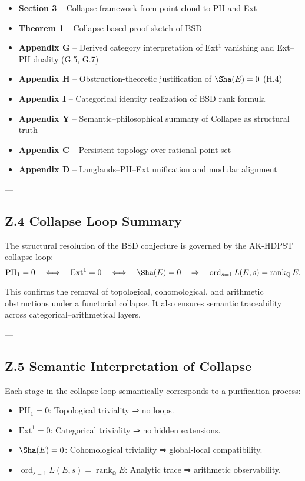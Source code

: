 \documentclass[11pt]{article}
\theoremstyle{definition}
\begin{document}
\begin{itemize}
  \item \textbf{Section 3} – Collapse framework from point cloud to PH and Ext
  \item \textbf{Theorem 1} – Collapse-based proof sketch of BSD
  \item \textbf{Appendix G} – Derived category interpretation of Ext$^1$ vanishing and Ext–PH duality (G.5, G.7)
  \item \textbf{Appendix H} – Obstruction-theoretic justification of \( \Sha(E) = 0 \) (H.4)
  \item \textbf{Appendix I} – Categorical identity realization of BSD rank formula
  \item \textbf{Appendix Y} – Semantic–philosophical summary of Collapse as structural truth
  \item \textbf{Appendix C} – Persistent topology over rational point set
  \item \textbf{Appendix D} – Langlands–PH–Ext unification and modular alignment
\end{itemize}

---

\subsection*{Z.4 Collapse Loop Summary}

The structural resolution of the BSD conjecture is governed by the AK-HDPST collapse loop:
\[
\mathrm{PH}_1 = 0 
\quad \Longleftrightarrow \quad \mathrm{Ext}^1 = 0 
\quad \Longleftrightarrow \quad \Sha(E) = 0 
\quad \Rightarrow \quad \operatorname{ord}_{s=1} L(E,s) = \operatorname{rank}_\mathbb{Q} E.
\]

This confirms the removal of topological, cohomological, and arithmetic obstructions under a functorial collapse.  
It also ensures semantic traceability across categorical–arithmetical layers.

---

\subsection*{Z.5 Semantic Interpretation of Collapse}

Each stage in the collapse loop semantically corresponds to a purification process:

\begin{itemize}
  \item \( \mathrm{PH}_1 = 0 \): Topological triviality ⇒ no loops.
  \item \( \mathrm{Ext}^1 = 0 \): Categorical triviality ⇒ no hidden extensions.
  \item \( \Sha(E) = 0 \): Cohomological triviality ⇒ global-local compatibility.
  \item \( \operatorname{ord}_{s=1} L(E,s) = \operatorname{rank}_\mathbb{Q} E \): Analytic trace ⇒ arithmetic observability.
\end{itemize}
\end{document}

